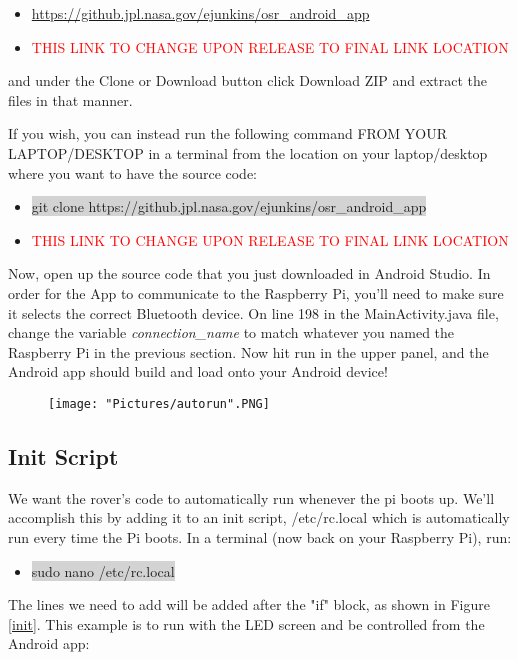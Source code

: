\documentclass[12pt]{article}
\begin{document}
\begin{itemize}
	\item[] \href{https://github.jpl.nasa.gov/ejunkins/osr_android_app}{https://github.jpl.nasa.gov/ejunkins/osr\_android\_app}
	\item[] \textcolor{red}{THIS LINK TO CHANGE UPON RELEASE TO FINAL LINK LOCATION}
\end{itemize}

\noindent and under the Clone or Download button click Download ZIP and extract the files in that manner. 

If you wish, you can instead run the following command FROM YOUR LAPTOP/DESKTOP in a terminal from the location on your laptop/desktop where you want to have the source code:

\begin{itemize}
	\item[] \colorbox{lightgray}{git clone https://github.jpl.nasa.gov/ejunkins/osr\_android\_app}
	\item[] \textcolor{red}{THIS LINK TO CHANGE UPON RELEASE TO FINAL LINK LOCATION}
\end{itemize}

\bigskip

\noindent Now, open up the source code that you just downloaded in Android Studio. In order for the App to communicate to the Raspberry Pi, you'll need to make sure it selects the correct Bluetooth device. On line 198 in the MainActivity.java file, change the variable \textit{connection\_name} to match whatever you named the Raspberry Pi in the previous section. Now hit run in the upper panel, and the Android app should build and load onto your Android device!

\begin{figure}[H]
 	\centering
	\texttt{[image: "Pictures/autorun".PNG]}
 	\caption{}
	\label{}
\end{figure}


\subsection{Init Script}
We want the rover's code to automatically run whenever the pi boots up. We'll accomplish this by adding it to an init script, /etc/rc.local which is automatically run every time the Pi boots. In a terminal (now back on your Raspberry Pi), run:
\begin{itemize}
	\item[] \colorbox{lightgray}{sudo nano /etc/rc.local}
\end{itemize}
\noindent The lines we need to add will be added after the "if" block, as shown in Figure \ref{init}. This example is to run with the LED screen and be controlled from the Android app:
\end{document}
